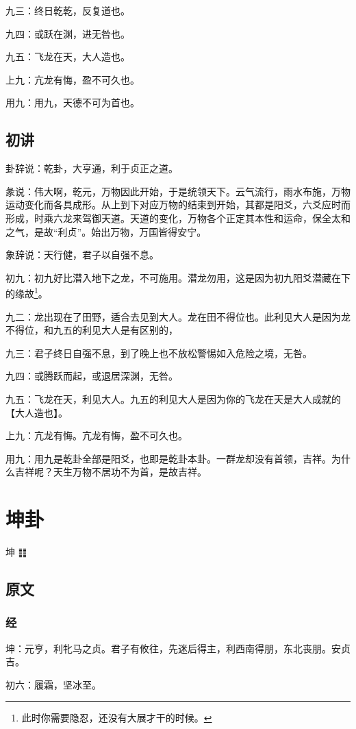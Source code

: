 \documentclass[12pt,oneside]{book}
\begin{document}
九三：终日乾乾，反复道也。

九四：或跃在渊，进无咎也。

九五：飞龙在天，大人造也。

上九：亢龙有悔，盈不可久也。

用九：用九，天德不可为首也。


\section{初讲}
卦辞说：乾卦，大亨通，利于贞正之道。

彖说：伟大啊，乾元，万物因此开始，于是统领天下。云气流行，雨水布施，万物运动变化而各具成形。从上到下对应万物的结束到开始，其都是阳爻，六爻应时而形成，时乘六龙来驾御天道。天道的变化，万物各个正定其本性和运命，保全太和之气，是故“利贞”。始出万物，万国皆得安宁。

象辞说：天行健，君子以自强不息。

初九：初九好比潜入地下之龙，不可施用。潜龙勿用，这是因为初九阳爻潜藏在下的缘故\footnote{此时你需要隐忍，还没有大展才干的时候。}。

九二：龙出现在了田野，适合去见到大人。龙在田不得位也。此利见大人是因为龙不得位，和九五的利见大人是有区别的，

九三：君子终日自强不息，到了晚上也不放松警惕如入危险之境，无咎。

九四：或腾跃而起，或退居深渊，无咎。

九五：飞龙在天，利见大人。九五的利见大人是因为你的飞龙在天是大人成就的【大人造也】。

上九：亢龙有悔。亢龙有悔，盈不可久也。

用九：用九是乾卦全部是阳爻，也即是乾卦本卦。一群龙却没有首领，吉祥。为什么吉祥呢？天生万物不居功不为首，是故吉祥。


\chapter{坤卦}
坤 {\Large ䷁}

\section{原文}
\subsection{经}
坤：元亨，利牝马之贞。君子有攸往，先迷后得主，利西南得朋，东北丧朋。安贞吉。

初六：履霜，坚冰至。
\end{document}
